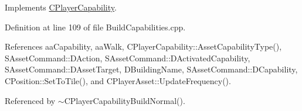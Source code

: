Implements \hyperlink{classCPlayerCapability_a2ca6fd7fbd9c0178f1cf1d049c63825f}{C\+Player\+Capability}.



Definition at line 109 of file Build\+Capabilities.\+cpp.



References aa\+Capability, aa\+Walk, C\+Player\+Capability\+::\+Asset\+Capability\+Type(), S\+Asset\+Command\+::\+D\+Action, S\+Asset\+Command\+::\+D\+Activated\+Capability, S\+Asset\+Command\+::\+D\+Asset\+Target, D\+Building\+Name, S\+Asset\+Command\+::\+D\+Capability, C\+Position\+::\+Set\+To\+Tile(), and C\+Player\+Asset\+::\+Update\+Frequency().



Referenced by $\sim$\+C\+Player\+Capability\+Build\+Normal().


